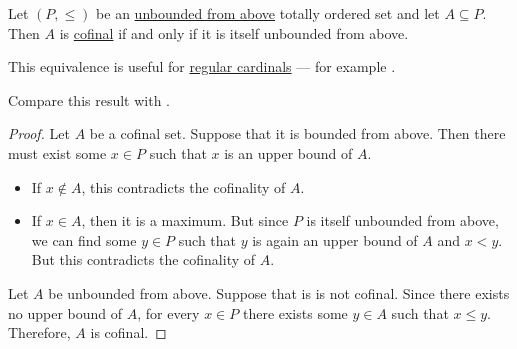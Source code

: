 \begin{proposition}\label{thm:totally_ordered_cofinal_equivalences}
  Let \( (P, \leq) \) be an \hyperref[def:partially_ordered_set_extremal_points/upper_and_lower_bounds]{unbounded from above} totally ordered set and let \( A \subseteq P \). Then \( A \) is \hyperref[def:cofinal_set]{cofinal} if and only if it is itself unbounded from above.

  This equivalence is useful for \hyperref[def:regular_cardinal]{regular cardinals} --- for example .

  Compare this result with .
\end{proposition}
\begin{proof}
  \SufficiencySubProof Let \( A \) be a cofinal set. Suppose that it is bounded from above. Then there must exist some \( x \in P \) such that \( x \) is an upper bound of \( A \).
  \begin{itemize}
    \item If \( x \not\in A \), this contradicts the cofinality of \( A \).
    \item If \( x \in A \), then it is a maximum. But since \( P \) is itself unbounded from above, we can find some \( y \in P \) such that \( y \) is again an upper bound of \( A \) and \( x < y \). But this contradicts the cofinality of \( A \).
  \end{itemize}

  \NecessitySubProof Let \( A \) be unbounded from above. Suppose that is is not cofinal. Since there exists no upper bound of \( A \), for every \( x\in P \) there exists some \( y \in A \) such that \( x \leq y \). Therefore, \( A \) is cofinal.
\end{proof}

